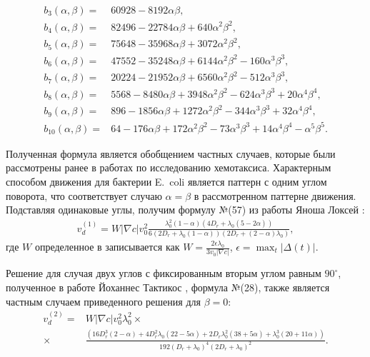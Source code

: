 \begin{equation}
\begin{aligned}
	b_3(\alpha, \beta) =& 60928 - 8192\alpha\beta, \\
	b_4(\alpha, \beta) =& 82496 - 22784\alpha\beta + 640\alpha^2\beta^2, \\
	b_5(\alpha, \beta) =& 75648 - 35968\alpha\beta + 3072\alpha^2\beta^2, \\
	b_6(\alpha, \beta) =& 47552 - 35248\alpha\beta + 6144\alpha^2\beta^2 - 160\alpha^3\beta^3, \\
	b_7(\alpha, \beta) =& 20224 - 21952\alpha\beta + 6560\alpha^2\beta^2 - 512\alpha^3\beta^3, \\
	b_8(\alpha, \beta) =& 5568 - 8480\alpha\beta + 3948\alpha^2\beta^2 - 624\alpha^3\beta^3 + 20\alpha^4\beta^4, \\
	b_9(\alpha, \beta) =& 896 - 1856\alpha\beta + 1272\alpha^2\beta^2 - 344\alpha^3\beta^3 + 32\alpha^4\beta^4, \\
	b_{10}(\alpha, \beta) =& 64 - 176\alpha\beta + 172\alpha^2\beta^2 - 73\alpha^3\beta^3 + 14\alpha^4\beta^4 - \alpha^5 \beta^5.
\end{aligned}
\end{equation}

Полученная формула является обобщением частных случаев, которые были рассмотрены ранее в работах по исследованию хемотаксиса. Характерным способом движения для бактерии E.~coli является паттерн с одним углом поворота, что соответствует случаю $\alpha=\beta$ в рассмотренном паттерне движения. Подставляя одинаковые углы, получим формулу №(57) из работы Яноша Локсей \cite{locsei_persistence_2007}:
\begin{equation}
    \begin{aligned}
        v_d^{(1)} = W|\nabla c|v_0^2\frac{\lambda_0^2(1-\alpha)(4D_r+\lambda_0(5-2\alpha))}{6(2D_r+\lambda_0(1-\alpha))(2D_r+(2-\alpha)\lambda_0)},
    \end{aligned}
\end{equation}
где $W$ определенное в \cite{locsei_persistence_2007} записывается как $W=\frac{2\epsilon\lambda_0}{3v_0|\nabla c|}$, $\epsilon=\max_t|\Delta(t)|$.

Решение для случая двух углов с фиксированным вторым углом равным $90^\circ$, полученное в работе Йоханнес Тактикос \cite{taktikos_how_2013}, формула №(28), также является частным случаем приведенного решения для $\beta=0$:
\begin{equation}
    \begin{aligned}
        v_d^{(2)} =& W |\nabla c| v_0^2 \lambda_0^2 \times \\
		\times& \frac{(16D_r^3(2-\alpha) + 4D_r^2\lambda_0(22-5\alpha) + 2D_r\lambda_0^2(38+5\alpha) + \lambda_0^3(20+11\alpha))}{192(D_r+\lambda_0)^4(2D_r+\lambda_0)^2}.
    \end{aligned}
\end{equation}

